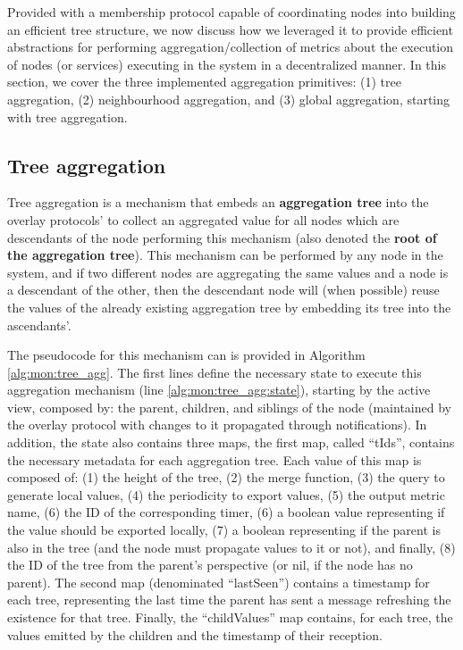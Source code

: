 
Provided with a membership protocol capable of coordinating nodes into building an efficient tree structure, we now discuss how we leveraged it to provide efficient abstractions for performing aggregation/collection of metrics about the execution of nodes (or services) executing in the system in a decentralized manner. In this section, we cover the three implemented aggregation primitives: (1) tree aggregation, (2) neighbourhood aggregation, and (3) global aggregation, starting with tree aggregation.

\subsection{Tree aggregation} \label{sec:mon_protocol:tree_agg}

Tree aggregation is a mechanism that embeds an \textbf{aggregation tree} into the overlay protocols' to collect an aggregated value for all nodes which are descendants of the node performing this mechanism (also denoted the \textbf{root of the aggregation tree}). This mechanism can be performed by any node in the system, and if two different nodes are aggregating the same values and a node is a descendant of the other, then the descendant node will (when possible) reuse the values of the already existing aggregation tree by embedding its tree into the ascendants'.

The pseudocode for this mechanism can is provided in Algorithm \ref{alg:mon:tree_agg}. The first lines define the necessary state to execute this aggregation mechanism (line \ref{alg:mon:tree_agg:state}), starting by the active view, composed by: the parent, children, and siblings of the node (maintained by the overlay protocol with changes to it propagated through notifications). In addition, the state also contains three maps, the first map, called ``tIds'', contains the necessary metadata for each aggregation tree. Each value of this map is composed of: (1) the height of the tree, (2) the merge function, (3) the query to generate local values, (4) the periodicity to export values, (5) the output metric name, (6) the ID of the corresponding timer, (6) a boolean value representing if the value should be exported locally, (7) a boolean representing if the parent is also in the tree (and the node must propagate values to it or not), and finally, (8) the ID of the tree from the parent's perspective (or nil, if the node has no parent). The second map (denominated ``lastSeen'') contains a timestamp for each tree, representing the last time the parent has sent a message refreshing the existence for that tree. Finally, the ``childValues'' map contains, for each tree, the values emitted by the children and the timestamp of their reception.

